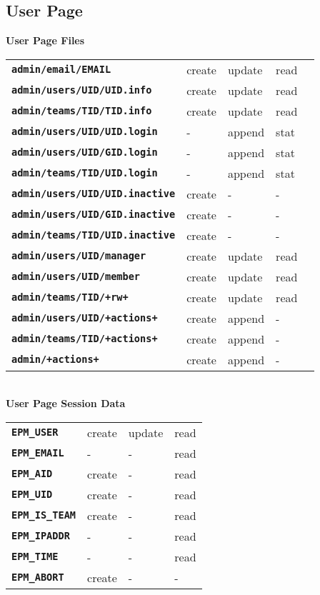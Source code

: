 \documentclass[12pt]{article}
\newcommand{\TT}[1]{{\tt \bfseries #1}}
\begin{document}
\newpage

\subsection{User Page}

\begin{center}
{\bf User Page Files}
\\[1ex]
\begin{tabular}{lllll}
\TT{admin/email/EMAIL}	& create  & update & read \\
\TT{admin/users/UID/UID.info}
			& create  & update & read \\
\TT{admin/teams/TID/TID.info}
			& create  & update & read \\
\TT{admin/users/UID/UID.login}
			& -       & append & stat \\
\TT{admin/users/UID/GID.login}
			& -       & append & stat \\
\TT{admin/teams/TID/UID.login}
			& -       & append & stat \\
\TT{admin/users/UID/UID.inactive}
			& create  & -      & - \\
\TT{admin/users/UID/GID.inactive}
			& create  & -      & - \\
\TT{admin/teams/TID/UID.inactive}
			& create  & -      & - \\
\TT{admin/users/UID/manager}
			& create  & update & read \\
\TT{admin/users/UID/member}
			& create  & update & read \\
\TT{admin/teams/TID/+rw+}
			& create  & update & read \\
\TT{admin/users/UID/+actions+}
			& create  & append & - \\
\TT{admin/teams/TID/+actions+}
			& create  & append & - \\
\TT{admin/+actions+}
			& create  & append & - \\
\end{tabular}
\\[3ex]
{\bf User Page Session Data}
\\[1ex]
\begin{tabular}{llll}
\TT{EPM\_USER}	& create  & update & read \\
\TT{EPM\_EMAIL}	& -       & -      & read \\
\TT{EPM\_AID}	& create  & -      & read \\
\TT{EPM\_UID}	& create  & -      & read \\
\TT{EPM\_IS\_TEAM}
                & create  & -      & read \\
\TT{EPM\_IPADDR}& -       & -      & read \\
\TT{EPM\_TIME}  & -       & -      & read \\
\TT{EPM\_ABORT} & create  & -      & - \\
\end{tabular}
\end{center}
\end{document}

